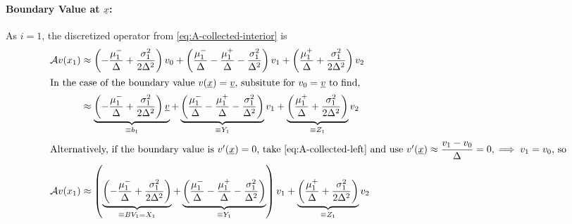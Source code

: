 \documentclass[11pt]{etk-article}
\begin{document}
\paragraph{Boundary Value at $\underline{x}$:}
As $i =1$, the discretized operator from \cref{eq:A-collected-interior} is
\begin{align}
\mathcal{A} v(x_1) &\approx \left(-\frac{\mu_1^{-}}{\Delta} +\frac{\sigma_1^2}{2\Delta^2}\right)v_0 + \left(\frac{\mu_1^{-}}{\Delta} - \frac{\mu_1^{+}}{\Delta}-\frac{\sigma_1^2}{\Delta^2}\right)v_1 + \left(\frac{\mu_1^{+}}{\Delta} + \frac{\sigma_1^2}{2\Delta^2}\right)v_2\label{eq:A-collected-left}\\
\intertext{In the case of the boundary value $v(\underline{x}) = \underline{v}$, subsitute for $v_0 =  \underline{v}$ to find,}
&\approx \underbrace{\left(-\frac{\mu_1^{-}}{\Delta} +\frac{\sigma_1^2}{2\Delta^2}\right)\underline{v}}_{\equiv b_1} +  \underbrace{\left(\frac{\mu_1^{-}}{\Delta} - \frac{\mu_1^{+}}{\Delta}-\frac{\sigma_1^2}{\Delta^2}\right)}_{\equiv Y_1}v_1 + \underbrace{\left(\frac{\mu_1^{+}}{\Delta} + \frac{\sigma_1^2}{2\Delta^2}\right)}_{\equiv Z_1}v_2\\
\intertext{Alternatively, if the boundary value is $v'(\underline{x}) = 0$, take \cref{eq:A-collected-left} and use $v'(\underline{x}) \approx \dfrac{v_1-v_0}{\Delta} = 0, \implies v_1 = v_0$, so}
\mathcal{A} v(x_1) &\approx \left(\underbrace{\left(-\frac{\mu_1^{-}}{\Delta} +\frac{\sigma_1^2}{2\Delta^2}\right)}_{\equiv BV_1 = X_1} + \underbrace{\left(\frac{\mu_1^{-}}{\Delta} - \frac{\mu_1^{+}}{\Delta}-\frac{\sigma_1^2}{\Delta^2}\right)}_{\equiv Y_1}\right)v_1 + \underbrace{\left(\frac{\mu_1^{+}}{\Delta} + \frac{\sigma_1^2}{2\Delta^2}\right)}_{\equiv Z_1}v_2\\
\end{align}
\end{document}
